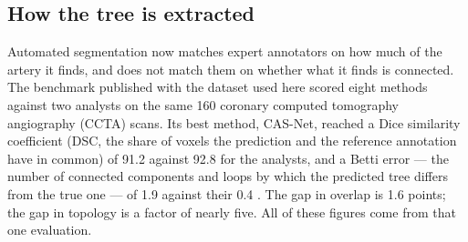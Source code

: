 
\subsection{How the tree is extracted}
\label{sec:gap-obtaining}

Automated segmentation now matches expert annotators on how much of the artery it finds, and does
not match them on whether what it finds is connected.
The benchmark published with the dataset used here scored eight methods against two analysts on the
same 160 coronary computed tomography angiography (CCTA) scans.
Its best method, CAS-Net, reached a Dice similarity coefficient (DSC, the share of voxels the
prediction and the reference annotation have in common) of 91.2 against 92.8 for the analysts, and a
Betti error --- the number of connected components and loops by which the predicted tree differs
from the true one --- of 1.9 against their 0.4 \cite{bransby2026imagecasx, dong2023casnet}.
The gap in overlap is 1.6 points; the gap in topology is a factor of nearly five.
All of these figures come from that one evaluation.

